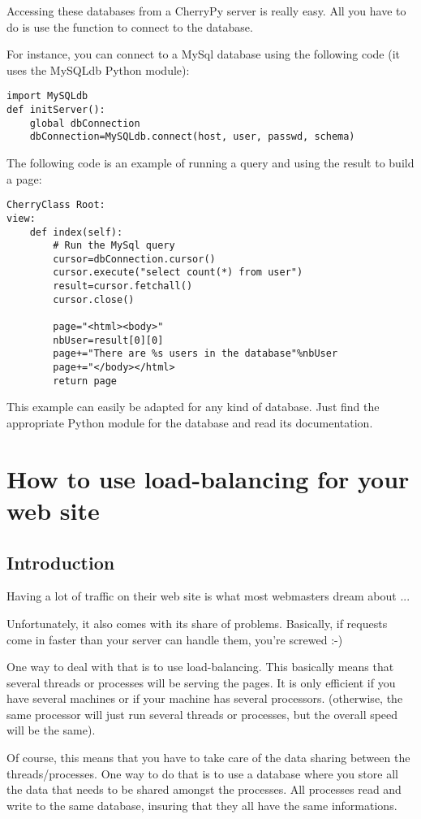 \documentclass{manual}
\begin{document}
Accessing these databases from a CherryPy server is really easy. All you have to do is use the 
function to connect to the database.

For instance, you can connect to a MySql database using the following code (it uses the MySQLdb Python module):
\begin{verbatim}
import MySQLdb
def initServer():
    global dbConnection
    dbConnection=MySQLdb.connect(host, user, passwd, schema)
\end{verbatim}
The following code is an example of running a query and using the result to build a page:
\begin{verbatim}
CherryClass Root:
view:
    def index(self):
        # Run the MySql query
        cursor=dbConnection.cursor()
        cursor.execute("select count(*) from user")
        result=cursor.fetchall()
        cursor.close()

        page="<html><body>"
        nbUser=result[0][0]
        page+="There are %s users in the database"%nbUser
        page+="</body></html>
        return page
\end{verbatim}

This example can easily be adapted for any kind of database. Just find the appropriate Python module for
the database and read its documentation.

\chapter{How to use load-balancing for your web site}
\section{Introduction}
Having a lot of traffic on their web site is what most webmasters dream about ...

Unfortunately, it also comes with its share of problems.
Basically, if requests come in faster than your server can handle them, you're screwed :-)

One way to deal with that is to use load-balancing. This basically means that several threads or processes will
be serving the pages. It is only efficient if you have several machines or if your machine has several processors.
(otherwise, the same processor will just run several threads or processes, but the overall speed will be the same).

Of course, this means that you have to take care of the data sharing between the threads/processes. One way to
do that is to use a database where you store all the data that needs to be shared amongst the processes. All processes
read and write to the same database, insuring that they all have the same informations.
\end{document}
